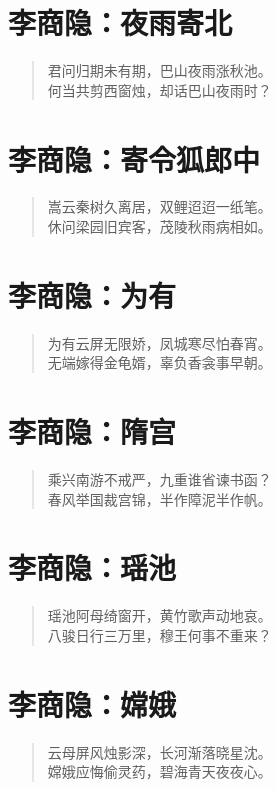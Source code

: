 \documentclass[12pt,oneside]{book}
\newenvironment{shici}{
\begin{verse}
\centering\large\hspace{12pt}}
{\end{verse}}
\begin{document}
\chapter{李商隐：夜雨寄北}
\begin{shici}
君问归期未有期，巴山夜雨涨秋池。\\
何当共剪西窗烛，却话巴山夜雨时？
\end{shici}

\chapter{李商隐：寄令狐郎中}
\begin{shici}
嵩云秦树久离居，双鲤迢迢一纸笔。\\
休问梁园旧宾客，茂陵秋雨病相如。
\end{shici}

\chapter{李商隐：为有}
\begin{shici}
为有云屏无限娇，凤城寒尽怕春宵。\\
无端嫁得金龟婿，辜负香衾事早朝。
\end{shici}

\chapter{李商隐：隋宫}
\begin{shici}
乘兴南游不戒严，九重谁省谏书函？\\
春风举国裁宫锦，半作障泥半作帆。
\end{shici}

\chapter{李商隐：瑶池}
\begin{shici}
瑶池阿母绮窗开，黄竹歌声动地哀。\\
八骏日行三万里，穆王何事不重来？
\end{shici}

\chapter{李商隐：嫦娥}
\begin{shici}
云母屏风烛影深，长河渐落晓星沈。\\
嫦娥应悔偷灵药，碧海青天夜夜心。
\end{shici}
\end{document}

